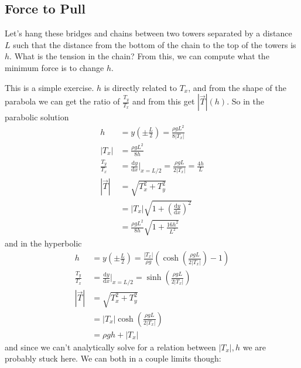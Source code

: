 \documentclass[12pt]{report}
\newcommand*{\rd}[2]{\frac{\mathrm{d}#1}{\mathrm{d}#2}}
\newcommand*{\abs}[1]{\left|#1\right|}
\begin{document}
\subsection{Force to Pull}

Let's hang these bridges and chains between two towers separated by a distance
$L$ such that the distance from the bottom of the chain to the top of the towers
is $h$. What is the tension in the chain? From this, we can compute what the
minimum force is to change $h$.

This is a simple exercise. $h$ is directly related to $T_x$, and from the shape
of the parabola we can get the ratio of $\frac{T_y}{T_x}$ and from this get
$\abs{\vec{T}}(h)$. So in the parabolic solution
\begin{align}
    h &= y\left( \pm \frac{L}{2} \right) = \frac{\rho g L^2}{8\abs{T_x}}
        \nonumber\\
    \abs{T_x} &= \frac{\rho g L^2}{8h}\nonumber\\
    \frac{T_y}{T_x} &= \rd{y}{x}\Bigg|_{x=L/2} = \frac{\rho g L}{2\abs{T_x}} =
        \frac{4h}{L}\nonumber\\
    \abs{\vec{T}} &= \sqrt{T_x^2 + T_y^2}\nonumber\\
    &= \abs{T_x}\sqrt{1 + \left(\rd{y}{x}\right)^2}\nonumber\\
    &= \frac{\rho g L^2}{8h}\sqrt{1 + \frac{16h^2}{L^2}}
\end{align}
and in the hyperbolic
\begin{align}
    h &= y\left( \pm \frac{L}{2} \right) = \frac{\abs{T_x}}{\rho g} \left(
        \cosh\left( \frac{\rho g L}{2\abs{T_x}} \right)
        - 1\right)
        \nonumber\\
    \frac{T_y}{T_x} &= \rd{y}{x}\Bigg|_{x=L/2} = \sinh \left(
        \frac{\rho g L}{2 \abs{T_x}}
    \right)\nonumber\\
    \abs{\vec{T}} &= \sqrt{T_x^2 + T_y^2}\nonumber\\
    &= \abs{T_x} \cosh \left( \frac{\rho g L}{2 \abs{T_x}} \right) \nonumber\\
    &= \rho g h + \abs{T_x}
\end{align}
and since we can't analytically solve for a relation between $\abs{T_x}, h$
we are probably stuck here. We can both in a couple limits though:
\end{document}
